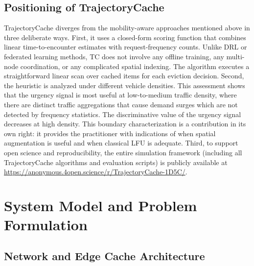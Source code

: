 \documentclass[preprint,12pt]{elsarticle}
\begin{document}
	\subsection{Positioning of TrajectoryCache}
	TrajectoryCache diverges from the mobility-aware approaches mentioned above in three deliberate ways. First, it uses a closed-form scoring function that combines linear time-to-encounter estimates with request-frequency counts. Unlike DRL or federated learning methods, TC does not involve any offline training, any multi-node coordination, or any complicated spatial indexing. The algorithm executes a straightforward linear scan over cached items for each eviction decision. Second, the heuristic is analyzed under different vehicle densities. This assessment shows that the urgency signal is most useful at low-to-medium traffic density, where there are distinct traffic aggregations that cause demand surges which are not detected by frequency statistics. The discriminative value of the urgency signal decreases at high density. This boundary characterization is a contribution in its own right: it provides the practitioner with indications of when spatial augmentation is useful and when classical LFU is adequate. Third, to support open science and reproducibility, the entire simulation framework (including all TrajectoryCache algorithms and evaluation scripts) is publicly available at \url{https://anonymous.4open.science/r/TrajectoryCache-1D5C/}.

	\section{System Model and Problem Formulation}
	\label{sec:system_model}
	
	\subsection{Network and Edge Cache Architecture}
	
\end{document}
